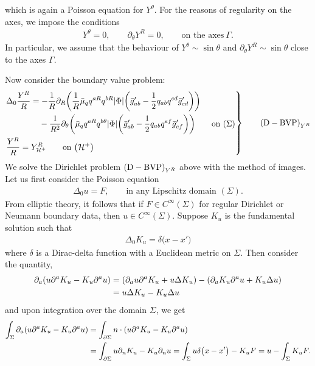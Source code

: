 \documentclass[11pt]{article}
\numberwithin{equation}{section}
\def\ptl{\partial}%
\def\halb{\frac{1}{2}}%
\numberwithin{equation}{section}
\begin{document}
which is again a Poisson equation for $Y^\theta$. For the reasons of regularity on the axes, we impose the conditions \cite{O_Rinne_J_Stewart_2005}{\samepage
\begin{align*}
Y^ \theta =0, \qquad \ptl_\theta Y^R =0, \qquad \text{on the axes} \ \Gamma.
\end{align*}
In particular, we assume that the behaviour of $Y^\theta \sim \sin \theta$ and $\ptl_\theta Y^R \sim \sin \theta$ close to the axes $\Gamma$.}

Now consider the boundary value problem:
\begin{equation*}
\left.\begin{aligned}
&\Delta_0 \frac{Y^R}{R} =- \frac{1}{R} \ptl_R \biggl(\frac{1}{R} \bar{\mu}_q q^{aR} q^{bR} \vert \Phi \vert \biggl(\bar{g}'_{ab} - \halb q_{ab} q^{cd} \bar{g}'_{cd}\biggr)\biggr) \notag \\
&\hphantom{\Delta_0 \frac{Y^R}{R} =}{} -\frac{1}{R^2} \ptl_ \theta \biggl(\bar{\mu}_q q^{aR} q^{b\theta} \vert \Phi \vert \biggl(\bar{g}'_{ab} - \halb q_{ab} q^{ef} \bar{g}'_{ef}\biggr)\biggr) \qquad \text{on} \ (\Sigma)\\
&\frac{Y^R}{R}= Y^R_{\mathcal{H}^+} \qquad \text{on} \ \bigl(\mathcal{H}^+\bigr)
\end{aligned}
 \right\}
\qquad {\rm (D-BVP)}_{Y^R}
\end{equation*}
We solve the Dirichlet problem ${\rm (D-BVP)}_{Y^R}$ above with the method of images. Let us first consider the Poisson equation
\begin{align*}
\Delta_0 u= F, \qquad \text{in any Lipschitz domain $(\Sigma)$}.
\end{align*}
From elliptic theory, it follows that if $F \in C^{\infty} (\Sigma)$ for regular Dirichlet or Neumann boundary data, then $u \in C^{\infty} (\Sigma)$.
Suppose $K_u$ is the fundamental solution such that
\begin{align*}
\Delta_0 K_u = \delta \bigl(x-x'\bigr)
\end{align*}
where $\delta$ is a Dirac-delta function with a Euclidean metric on $\Sigma$.
Then consider the quantity,
\begin{align*}
\ptl_a (u \ptl^a K_u - K_u \ptl^a u) &{}= (\ptl_a u \ptl^a K_u+ u \Delta K_u) - (\ptl_a K_u \ptl^a u + K_u \Delta u) \notag\\
&{}= u \Delta K_u - K_u \Delta u
\end{align*}
and upon integration over the domain $\Sigma$, we get
\begin{align*}
\int_{\Sigma} \ptl_a (u \ptl^a K_{u} - K_{u} \ptl^a u) &{}= \int_{\ptl \Sigma} n \cdot (u\ptl^a K_{u} - K_{u} \ptl^a u) \notag \\
&{}= \int_{\ptl \Sigma} u \ptl_n K_u - K_u \ptl_n u
= \int_{\Sigma} u\delta \bigl(x-x'\bigr) - K_u F = u - \int_{\Sigma} K_u F.
\end{align*}
\end{document}
